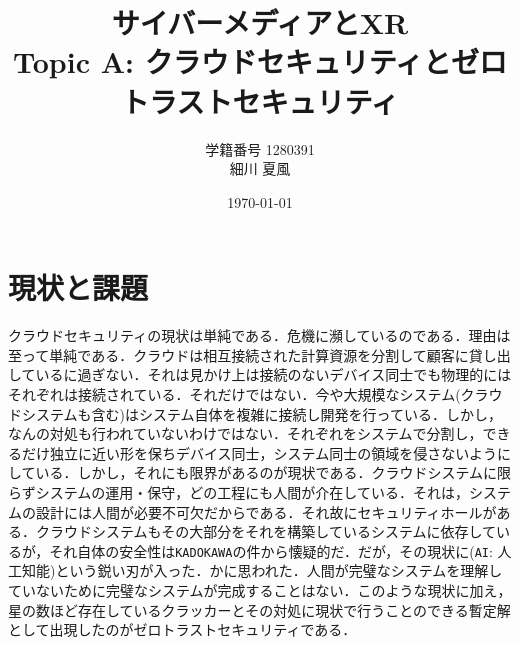 \documentclass[paper=a4, fontsize=10pt]{jlreq}
\title{サイバーメディアとXR \\ Topic A: クラウドセキュリティとゼロトラストセキュリティ}
\author{学籍番号 1280391 \\ 細川 夏風}
\date{\today}
\begin{document}
\maketitle

\section{現状と課題}
クラウドセキュリティの現状は単純である．危機に瀕しているのである．理由は至って単純である．クラウドは相互接続された計算資源を分割して顧客に貸し出しているに過ぎない．それは見かけ上は接続のないデバイス同士でも物理的にはそれぞれは接続されている．それだけではない．今や大規模なシステム(クラウドシステムも含む)はシステム自体を複雑に接続し開発を行っている．しかし，なんの対処も行われていないわけではない．それぞれをシステムで分割し，できるだけ独立に近い形を保ちデバイス同士，システム同士の領域を侵さないようにしている．しかし，それにも限界があるのが現状である．クラウドシステムに限らずシステムの運用・保守，どの工程にも人間が介在している．それは，システムの設計には人間が必要不可欠だからである．それ故にセキュリティホールがある．クラウドシステムもその大部分をそれを構築しているシステムに依存しているが，それ自体の安全性は\texttt{KADOKAWA}の件から懐疑的だ\cite{KADOKAWA}．だが，その現状に(\texttt{AI}: 人工知能)という鋭い刃が入った．かに思われた．人間が完璧なシステムを理解していないために完璧なシステムが完成することはない．このような現状に加え，星の数ほど存在しているクラッカーとその対処に現状で行うことのできる暫定解として出現したのがゼロトラストセキュリティである．
\end{document}
